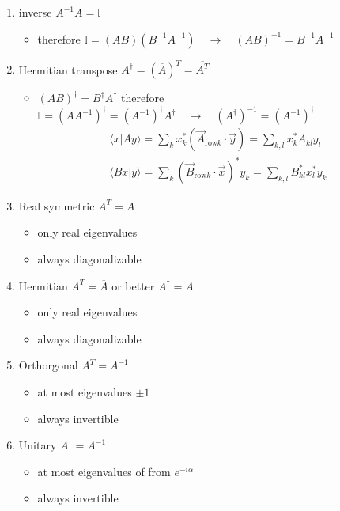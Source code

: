 \documentclass[../main.tex]{subfiles}
\begin{document}
\begin{enumerate}
    \item inverse $A^{-1}A=\mathbb{I}$
    \begin{itemize}
        \item therefore $\mathbb{I}=(AB)(B^{-1}A^{-1})\quad\rightarrow\quad (AB)^{-1}=B^{-1}A^{-1}$
    \end{itemize}
    \item Hermitian transpose $A^\dagger = (\overline{A})^T = \overline{A^T}$
        \begin{itemize}
        \item $(AB)^\dagger=B^\dagger A^\dagger$ therefore $\mathbb{I}=(AA^{-1})^\dagger=(A^{-1})^\dagger A^\dagger\quad\rightarrow\quad (A^\dagger)^{-1}=(A^{-1})^\dagger$
        \begin{align}
        \langle x |A y\rangle=\sum_k x_k^* (\vec{A}_{\text{row}k}\cdot\vec{y})=\sum_{k,l} x_k^* A_{kl}y_l\\
        \langle Bx |y\rangle = \sum_k(\vec{B}_{\text{row}k}\cdot \vec{x})^*y_k= \sum_{k,l}B_{kl}^*x_l^*y_k
        \end{align}
    \end{itemize}
    \item Real symmetric $A^T = A$
    	\begin{itemize}
    	\item only real eigenvalues
    	\item always diagonalizable
    	\end{itemize}
    \item Hermitian $A^T = \overline{A}$ or better $A^\dagger = A$
        \begin{itemize}
    	\item only real eigenvalues
    	\item always diagonalizable
    	\end{itemize}
    \item Orthorgonal $A^T = A^{-1}$
        \begin{itemize}
    	\item at most eigenvalues $\pm1$
    	\item always invertible
    	\end{itemize}
    \item Unitary $A^\dagger = A^{-1}$
    	\begin{itemize}
    	\item at most eigenvalues of from $e^{-i\alpha}$
    	\item always invertible
    	\end{itemize}
\end{enumerate}
\end{document}
